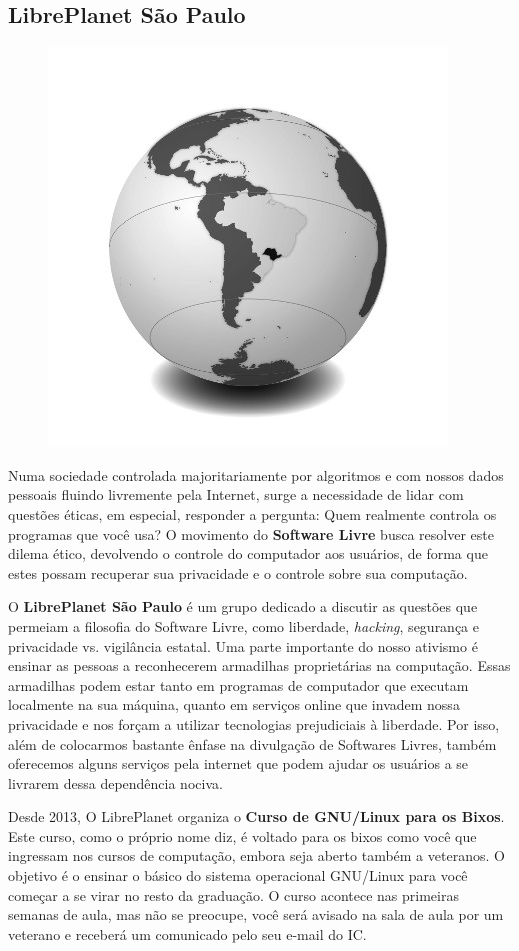 \subsection{LibrePlanet São Paulo}

\begin{figure}[h!]
    \centering
    \includegraphics[width=.45\textwidth]{img/alem_da_graduacao/lp-br-sp-logo.jpg}
\end{figure}

Numa sociedade controlada majoritariamente por algoritmos e com nossos
dados pessoais fluindo livremente pela Internet, surge a necessidade de
lidar com questões éticas, em especial, responder a pergunta: Quem
realmente controla os programas que você usa?  O movimento do {\bf Software
Livre} busca resolver este dilema ético, devolvendo o controle do
computador aos usuários, de forma que estes possam recuperar sua
privacidade e o controle sobre sua computação.

O {\bf LibrePlanet São Paulo} é um grupo dedicado a discutir as questões que
permeiam a filosofia do Software Livre, como liberdade, \emph{hacking},
segurança e privacidade vs. vigilância estatal.  Uma parte importante do
nosso ativismo é ensinar as pessoas a reconhecerem armadilhas
proprietárias na computação. Essas armadilhas podem estar tanto em
programas de computador que executam localmente na sua máquina, quanto
em serviços online que invadem nossa privacidade e nos forçam a utilizar
tecnologias prejudiciais à liberdade.  Por isso, além de colocarmos
bastante ênfase na divulgação de Softwares Livres, também oferecemos
alguns serviços pela internet que podem ajudar os usuários a se livrarem
dessa dependência nociva.

Desde 2013, O LibrePlanet organiza o {\bf Curso de GNU/Linux para os
  Bixos}.  Este curso, como o próprio nome diz, é voltado para os bixos
como você que ingressam nos cursos de computação, embora seja aberto
também a veteranos. O objetivo é o ensinar o básico do sistema
operacional GNU/Linux para você começar a se virar no resto da
graduação.  O curso acontece nas primeiras semanas de aula, mas não se
preocupe, você será avisado na sala de aula por um veterano e receberá
um comunicado pelo seu e-mail do IC.

